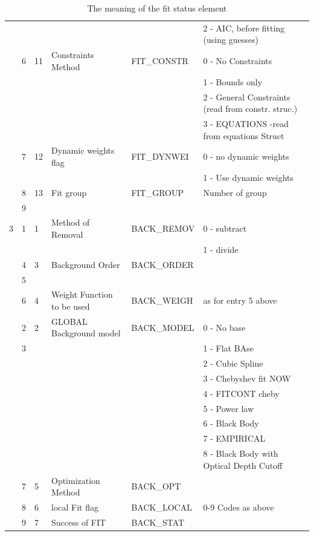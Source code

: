 \documentclass[11pt,twoside]{article}
\newenvironment{latexonly}{}{}
\begin{document}
\begin{latexonly}
\begin{table}
\begin{center}
\begin{tabular}{|l|l|l|l|l|l|}
  &   &   &  & &         2 - AIC, before fitting (using guesses)\\ \cline{2-6}
  & 6 & 11 & Constraints Method & FIT\_CONSTR & 0 - No Constraints\\
  &   &   &  & & 1 - Bounds only\\
  &   &   &  & & 2 - General Constraints (read from constr. struc.)\\
  &   &   &  & & 3 - EQUATIONS  -read from equations Struct\\ \cline{2-6}
  & 7 & 12 & Dynamic weights flag & FIT\_DYNWEI & 0 - no dynamic weights\\
  &   &   &  & & 1 - Use dynamic weights\\ \cline{2-6}
  & 8 & 13 & Fit group & FIT\_GROUP & Number of group \\
  & 9 &    & & & \\
\hline
3  & 1 & 1 &Method of Removal & BACK\_REMOV & 0 - subtract \\
  &   &   &                  & & 1 - divide\\
\cline{2-6}
  & 4 & 3 & Background Order & BACK\_ORDER & \\
  & 5 & & & & \\
\cline{2-6}
  & 6 & 4 & Weight Function to be used & BACK\_WEIGH & as for entry 5 above \\
\cline{2-6}
  & 2 & 2 &GLOBAL Background model & BACK\_MODEL & 0 - No base\\
  & 3 &   &                        & & 1 - Flat BAse\\
  &   &   &                        & & 2 - Cubic Spline\\
  &   &   &                        & & 3 - Chebyshev fit NOW\\
  &   &   &                        & & 4 - FITCONT cheby\\
  &   &   &                        & & 5 - Power law\\
  &   &   &                        & & 6 - Black Body\\
  &   &   &                        & & 7 - EMPIRICAL\\
  &   &   &    & & 8 - Black Body with Optical Depth Cutoff\\
\cline{2-6}
 & 7 & 5 & Optimization Method & BACK\_OPT & \\ \cline{2-6}
 & 8 & 6 & local Fit flag & BACK\_LOCAL & 0-9 Codes as above \\ \cline{2-6}
 & 9 & 7 &      Success of FIT & BACK\_STAT & \\
\hline
\end{tabular}
\caption[a]{The meaning of the fit status element}
\label{tb.fitstatus}
\end{center}
\end{table}
\end{latexonly}
\end{document}

